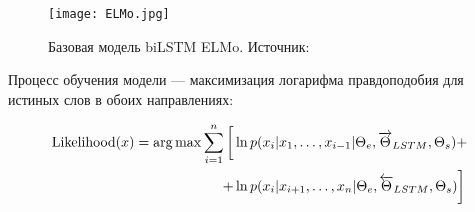\begin{figure}[ht]
    \centering
    \texttt{[image: ELMo.jpg]}
    \caption{Базовая модель biLSTM ELMo. Источник: \cite{elmopic}}
    \label{fig:elmo}
\end{figure}

\bigskip
Процесс обучения модели --- максимизация логарифма правдоподобия для истиных слов в обоих направлениях:

\begin{equation*}
\begin{aligned}
 \operatorname*{Likelihood} (x) = \operatorname*{arg\,max} \sum_{i=1}^n \bigg[ & \ln p(x_i| x_1, \ldots,
x_{i-1}|\Theta_e,\overrightarrow{\Theta}_{LSTM}, \Theta_s) + \\
 + & \ln p(x_i| x_{i+1}, \ldots, x_n| \Theta_e,\overleftarrow{\Theta}_{LSTM}, \Theta_s)\bigg]
\end{aligned}
\end{equation*}






